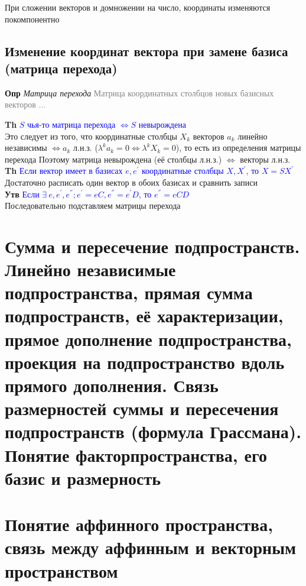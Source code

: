 \documentclass[a4paper, 14pt]{article}
\begin{document}
    При сложении векторов и домножении на число, координаты изменяются покомпонентно

    \subsection{Изменение координат вектора при замене базиса (матрица перехода)}

    \textbf{Опр} \textit{Матрица перехода} \textcolor{gray}{Матрица координатных столбцов новых базисных векторов ...}

    \textbf{Th} \textcolor{blue}{$S$ чья-то матрица перехода $\Leftrightarrow S$ невырождена} \\

    Это следует из того, что координатные столбцы $X_k$ векторов $a_k$ линейно независимы $\Leftrightarrow a_k$ л.н.з.
    ($\lambda^k a_k = 0 \Leftrightarrow \lambda^k X_k = 0$), то есть из определения матрицы перехода
    Поэтому матрица невырождена (её столбцы л.н.з.) $\Leftrightarrow$ векторы л.н.з. \\

    \textbf{Th} \textcolor{blue}{Если вектор имеет в базисах $e, e^{'}$ координатные столбцы $X, X^{'}$, то $X = SX^{
        '}$} \\

    Достаточно расписать один вектор в обоих базисах и сравнить записи \\

    \textbf{Утв} \textcolor{blue}{Если $\exists~e, e^{'}, e^{''}; e^{'} = eC, e^{''} = e^{'}D$, то $e^{''} = eCD$} \\

    Последовательно подставляем матрицы перехода

    \section{Сумма и пересечение подпространств.
    Линейно независимые подпространства, прямая сумма подпространств, её характеризации, прямое дополнение
    подпространства, проекция на подпространство вдоль прямого дополнения.
    Связь размерностей суммы и пересечения подпространств (формула Грассмана).
    Понятие факторпространства, его базис и размерность}

    


    \section{Понятие аффинного пространства, связь между аффинным и векторным пространством}
\end{document}
